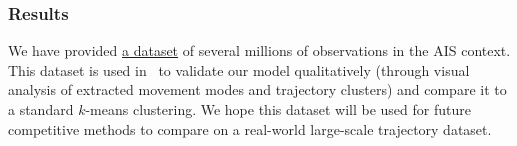 \subsubsection{Results}

We have provided \href{https://github.com/rtavenar/ushant_ais}{a dataset} of several
millions of observations in the AIS context.
This dataset is used in~\cite{gloaguen2020} to validate our model qualitatively (through visual
analysis of extracted movement modes and trajectory clusters) and compare it to
a standard $k$-means clustering.
We hope this dataset will be used for future competitive methods to compare on a
real-world large-scale trajectory dataset.
